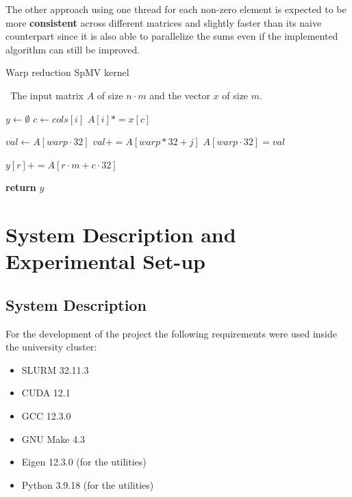\documentclass[conference]{IEEEtran}
\begin{document}
    The other approach using one thread for each non-zero element is expected
    to be more \textbf{consistent} across different matrices and slightly
    faster than its naive counterpart since it is also able to parallelize the
    sums even if the implemented algorithm can still be improved.
    \begin{algorithm}[!ht]
        \caption{Warp reduction SpMV kernel}
        \algorithmicrequire~The input matrix $A$ of size $n \cdot m$ and the vector $x$ of size $m$.
        \begin{algorithmic}[1]
                \State $y \gets \emptyset$
                    \State $c \gets cols[i]$
                    \State $A[i] *= x[c]$
                \EndFor

                    \State $val \gets A[warp \cdot 32]$
                            \State $val += A[warp * 32 + j]$
                        \EndFor
                    \EndFor
                    \State $A[warp \cdot 32] = val$
                \EndFor

                        \State $y[r] += A[r \cdot m + c \cdot 32]$
                    \EndFor
                \EndFor

                \State \textbf{return} $y$
            \EndProcedure
        \end{algorithmic}
        \label{alg:SpMVrow}
    \end{algorithm}

    \section{System Description and Experimental Set-up}
        \subsection{System Description}

        For the development of the project the following requirements were used
        inside the university cluster:
        \begin{itemize}
            \item SLURM 32.11.3
            \item CUDA 12.1
            \item GCC 12.3.0
            \item GNU Make 4.3
            \item Eigen 12.3.0 (for the utilities)
            \item Python 3.9.18 (for the utilities) 
        \end{itemize}
\end{document}
